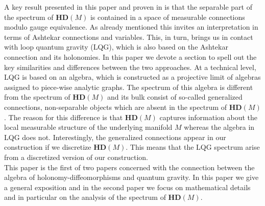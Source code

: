 \documentclass[12pt]{article}
\begin{document}
A key result presented in this paper and proven in \cite{AGnew} is that the separable part of the spectrum of $\mathbf{HD}(M) $ is contained in a space of measurable connections modulo gauge equivalence. As already mentioned this invites an interpretation in terms of Ashtekar connections and variables. This, in turn, brings us in contact with loop quantum gravity (LQG), which is also based on the Ashtekar connection and its holonomies. In this paper we devote a section to spell out the key similarities and differences between the two approaches. At a technical level, LQG is based on an algebra, which is constructed as a projective limit of algebras assigned to piece-wise analytic graphs. The spectrum of this algebra is different from the spectrum of $\mathbf{HD}(M) $ and its bulk consist of so-called generalized connections, non-separable objects which are absent in the spectrum of $\mathbf{HD}(M) $. The reason for this difference is that $\mathbf{HD}(M) $ captures information about the local measurable structure of the underlying manifold $M$ whereas the algebra in LQG does not. Interestingly, the generalized connections appear in our construction if we discretize $\mathbf{HD}(M) $. This means that the LQG spectrum arise from a discretized version of our construction. \\%
















This paper is the first of two papers concerned with the connection between the algebra of holonomy-diffeomorphisms and quantum gravity. In this paper we give a general exposition and in the second paper \cite{AGnew} we focus on mathematical details and in particular on the analysis of the spectrum of $\mathbf{HD}(M) $. \\
\end{document}
